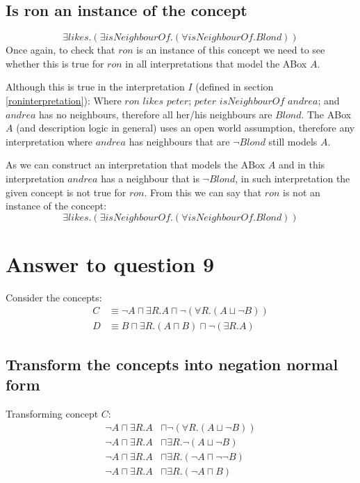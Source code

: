 \documentclass[a4paper,12pt]{article}
\begin{document}
\subsection[For all]{Is ron an instance of the concept}
\begin{equation*}
\exists likes.(\exists isNeighbourOf.(\forall isNeighbourOf.Blond))
\end{equation*}
Once again, to check that $ron$ is an instance of this concept we need to see
whether this is true for $ron$ in all interpretations that model the ABox $A$.

Although this is true in the interpretation $I$ (defined in section
\ref{roninterpretation}):  Where $ron$ $likes$ $peter$; $peter$ $isNeighbourOf$
$andrea$; and $andrea$ has no neighbours, therefore all her/his neighbours are
$Blond$.  The ABox $A$ (and description logic in general) uses an open world
assumption, therefore any interpretation where $andrea$ has neighbours that are
$\neg Blond$ still models $A$.

As we can construct an interpretation that models the ABox $A$ and in this
interpretation $andrea$ has a neighbour that is $\neg Blond$, in such
interpretation the given concept is not true for $ron$.  From this we can say
that $ron$ is not an instance of the concept:
\begin{equation*}
\exists likes.(\exists isNeighbourOf.(\forall isNeighbourOf.Blond))
\end{equation*}

\section[Question 9]{Answer to question 9}

Consider the concepts:
\begin{align*}
C &\equiv \neg A \sqcap \exists R.A \sqcap \neg(\forall R.(A \sqcup \neg B))\\
D &\equiv B \sqcap \exists R.(A \sqcap B) \sqcap \neg(\exists R.A)
\end{align*}

\subsection[NNF]{Transform the concepts into negation normal form}
Transforming concept $C$:
\begin{align*}
\neg A \sqcap \exists R.A &\sqcap \neg(\forall R.(A \sqcup \neg B))\\
\neg A \sqcap \exists R.A &\sqcap \exists R.\neg(A \sqcup \neg B)\\
\neg A \sqcap \exists R.A &\sqcap \exists R.(\neg A \sqcap \neg \neg B)\\
\neg A \sqcap \exists R.A &\sqcap \exists R.(\neg A \sqcap B)
\end{align*}
\end{document}
